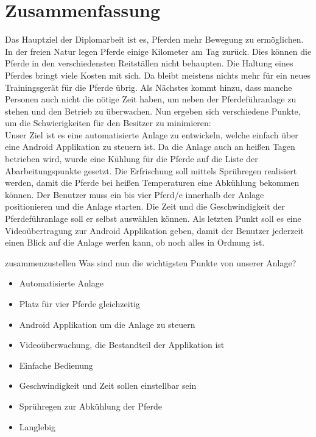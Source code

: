 \section*{Zusammenfassung}

Das Hauptziel der Diplomarbeit ist es, Pferden mehr Bewegung zu ermöglichen. In der freien Natur legen Pferde einige Kilometer am Tag zurück. Dies können die Pferde in den verschiedensten Reitställen nicht behaupten. Die Haltung eines Pferdes bringt viele Kosten mit sich. Da bleibt meistens nichts mehr für ein neues Trainingsgerät für die Pferde übrig. Als Nächstes kommt hinzu, dass manche Personen auch nicht die nötige Zeit haben, um neben der Pferdeführanlage zu stehen und den Betrieb zu überwachen. Nun ergeben sich verschiedene Punkte, um die Schwierigkeiten für den Besitzer zu minimieren: \\
Unser Ziel ist es eine automatisierte Anlage zu entwickeln, welche einfach über eine Android Applikation zu steuern ist. Da die Anlage auch an heißen Tagen betrieben wird, wurde eine Kühlung für die Pferde auf die Liste der Abarbeitungspunkte gesetzt. Die Erfrischung soll mittels Sprühregen realisiert werden, damit die Pferde bei heißen Temperaturen eine Abkühlung bekommen können. Der Benutzer muss ein bis vier Pferd/e innerhalb der Anlage positionieren und die Anlage starten. Die Zeit und die Geschwindigkeit der Pferdeführanlage soll er selbst auswählen können. Als letzten Punkt soll es eine Videoübertragung zur Android Applikation geben, damit der Benutzer jederzeit einen Blick auf die Anlage werfen kann, ob noch alles in Ordnung ist.  \newline{}

zusammenzustellen 
Was sind nun die wichtigsten Punkte von unserer Anlage?\\

\begin{itemize}
\item{Automatisierte Anlage}
\item{Platz für vier Pferde gleichzeitig}
\item{Android Applikation um die Anlage zu steuern}
\item{Videoüberwachung, die Bestandteil der Applikation ist}
\item{Einfache Bedienung}
\item{Geschwindigkeit und Zeit sollen einstellbar sein} 
\item{Sprühregen zur Abkühlung der Pferde}
\item{Langlebig}
\end{itemize}

